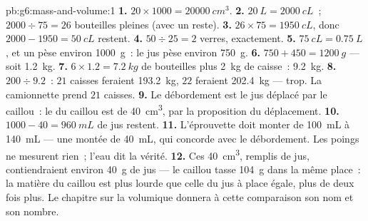 \begin{solution}{pb:g6:mass-and-volume:1}
\textbf{1.} $20 \times 1000 = \qty{20000}{cm^3}$.
\textbf{2.} $\qty{20}{L} = \qty{2000}{cL}$~; $2000 \div 75 = 26$
bouteilles pleines (avec un reste).
\textbf{3.} $26 \times 75 = \qty{1950}{cL}$, donc
$2000 - 1950 = \qty{50}{cL}$ restent.
\textbf{4.} $50 \div 25 = 2$ verres, exactement.
\textbf{5.} $\qty{75}{cL} = \qty{0.75}{L}$, et un  pèse environ
\qty{1000}{g}~: le jus pèse environ \qty{750}{g}.
\textbf{6.} $750 + 450 = \qty{1200}{g}$ --- soit \qty{1.2}{kg}.
\textbf{7.} $6 \times 1.2 = \qty{7.2}{kg}$ de bouteilles plus
\qty{2}{kg} de caisse~: \qty{9.2}{kg}.
\textbf{8.} $200 \div 9.2$~: $21$ caisses feraient \qty{193.2}{kg},
$22$ feraient \qty{202.4}{kg} --- trop. La camionnette prend $21$
caisses.
\textbf{9.} Le débordement est le jus déplacé par le caillou~: le
 du caillou est de \qty{40}{cm^3}, par la proposition du
déplacement.
\textbf{10.} $1000 - 40 = \qty{960}{mL}$ de jus restent.
\textbf{11.} L'éprouvette doit monter de \qty{100}{mL} à
\qty{140}{mL} --- une montée de \qty{40}{mL}, qui concorde avec le
débordement. Les poings ne mesurent rien~; l'eau dit la vérité.
\textbf{12.} Ces \qty{40}{cm^3}, remplis de jus, contiendraient
environ \qty{40}{g} de jus --- le caillou tasse \qty{104}{g} dans la
même place~: la matière du caillou est plus lourde que celle du jus à
place égale, plus de deux fois plus. Le chapitre sur la 
volumique donnera à cette comparaison son nom et son nombre.
\end{solution}
